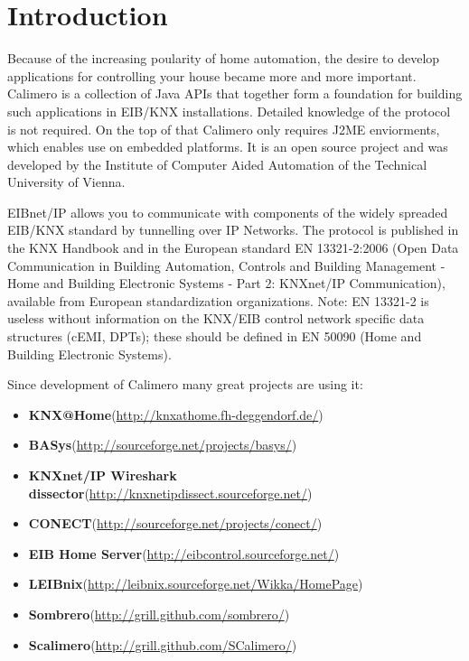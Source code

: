 \chapter{Introduction}

Because of the increasing poularity of home automation, the desire to develop applications for controlling your house became more and more important. Calimero is a collection of Java APIs that together form a foundation for building such applications in EIB/KNX installations. Detailed knowledge of the protocol is not required. On the top of that Calimero only requires J2ME enviorments, which enables use on embedded platforms. It is an open source project and was developed by the Institute of Computer Aided Automation of the Technical University of Vienna.

EIBnet/IP allows you to communicate with components of the widely spreaded EIB/KNX standard by tunnelling over IP Networks. The protocol is published in the KNX Handbook  and in the European standard EN 13321-2:2006 (Open Data Communication in Building Automation, Controls and Building Management - Home and Building Electronic Systems - Part 2: KNXnet/IP Communication), available from European standardization organizations. Note: EN 13321-2 is useless without information on the KNX/EIB control network specific data structures (cEMI, DPTs); these should be defined in EN 50090 (Home and Building Electronic Systems). 

\clearpage
Since development of Calimero many great projects are using it:
\begin{itemize}
	\item \textbf{KNX@Home}(\url{http://knxathome.fh-deggendorf.de/})
	\item \textbf{BASys}(\url{http://sourceforge.net/projects/basys/})
	\item \textbf{KNXnet/IP Wireshark dissector}(\url{http://knxnetipdissect.sourceforge.net/})
	\item \textbf{CONECT}(\url{http://sourceforge.net/projects/conect/})
	\item \textbf{EIB Home Server}(\url{http://eibcontrol.sourceforge.net/})
	\item \textbf{LEIBnix}(\url{http://leibnix.sourceforge.net/Wikka/HomePage})
	\item \textbf{Sombrero}(\url{http://grill.github.com/sombrero/})
	\item \textbf{Scalimero}(\url{http://grill.github.com/SCalimero/})
\end{itemize}
\clearpage
